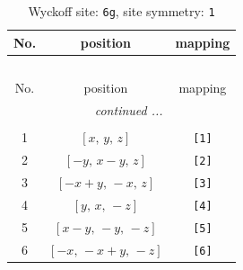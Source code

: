 \documentclass[fleqn,8pt]{jsarticle}
\begin{document}
\begin{longtable}{ccc}
\caption{Wyckoff site: {\tt 6g}, site symmetry: {\tt 1}}
 \\
 \hline \hline
No. & position & mapping \\ \hline \endfirsthead

\multicolumn{2}{l}{\tablename\ \thetable{}} \\
 \hline \hline
No. & position & mapping \\ \hline \endhead

 \hline \hline
\multicolumn{2}{r}{\footnotesize\it continued ...} \\ \endfoot

 \hline \hline
\multicolumn{2}{r}{} \\ \endlastfoot

1 & $\left[ x,\, y,\, z \right]$ & {\tt [1]} \\ \hline
2 & $\left[ - y,\, x - y,\, z \right]$ & {\tt [2]} \\ \hline
3 & $\left[ - x + y,\, - x,\, z \right]$ & {\tt [3]} \\ \hline
4 & $\left[ y,\, x,\, - z \right]$ & {\tt [4]} \\ \hline
5 & $\left[ x - y,\, - y,\, - z \right]$ & {\tt [5]} \\ \hline
6 & $\left[ - x,\, - x + y,\, - z \right]$ & {\tt [6]} \\
\end{longtable}
\end{document}
